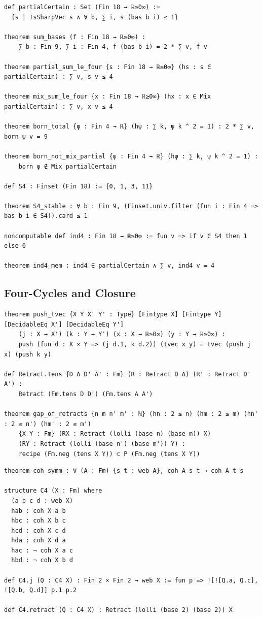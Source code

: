 \label{lean:quantum-partial}
\begin{lstlisting}
def partialCertain : Set (Fin 18 → ℝ≥0∞) :=
  {s | IsSharpVec s ∧ ∀ b, ∑ i, s (bas b i) ≤ 1}

theorem sum_bases (f : Fin 18 → ℝ≥0∞) :
    ∑ b : Fin 9, ∑ i : Fin 4, f (bas b i) = 2 * ∑ v, f v

theorem partial_sum_le_four {s : Fin 18 → ℝ≥0∞} (hs : s ∈ partialCertain) : ∑ v, s v ≤ 4

theorem mix_sum_le_four {x : Fin 18 → ℝ≥0∞} (hx : x ∈ Mix partialCertain) : ∑ v, x v ≤ 4

theorem born_total {ψ : Fin 4 → ℝ} (hψ : ∑ k, ψ k ^ 2 = 1) : 2 * ∑ v, born ψ v = 9

theorem born_not_mix_partial {ψ : Fin 4 → ℝ} (hψ : ∑ k, ψ k ^ 2 = 1) :
    born ψ ∉ Mix partialCertain

def S4 : Finset (Fin 18) := {0, 1, 3, 11}

theorem S4_stable : ∀ b : Fin 9, (Finset.univ.filter (fun i : Fin 4 => bas b i ∈ S4)).card ≤ 1

noncomputable def ind4 : Fin 18 → ℝ≥0∞ := fun v => if v ∈ S4 then 1 else 0

theorem ind4_mem : ind4 ∈ partialCertain ∧ ∑ v, ind4 v = 4
\end{lstlisting}

\subsection{Four-Cycles and Closure}

\label{lean:retract-tens}
\begin{lstlisting}
theorem push_tvec {X Y X' Y' : Type} [Fintype X] [Fintype Y] [DecidableEq X'] [DecidableEq Y']
    (j : X → X') (k : Y → Y') (x : X → ℝ≥0∞) (y : Y → ℝ≥0∞) :
    push (fun d : X × Y => (j d.1, k d.2)) (tvec x y) = tvec (push j x) (push k y)

def Retract.tens {D A D' A' : Fm} (R : Retract D A) (R' : Retract D' A') :
    Retract (Fm.tens D D') (Fm.tens A A')

theorem gap_of_retracts {n m n' m' : ℕ} (hn : 2 ≤ n) (hm : 2 ≤ m) (hn' : 2 ≤ n') (hm' : 2 ≤ m')
    {X Y : Fm} (RX : Retract (lolli (base n) (base m)) X)
    (RY : Retract (lolli (base n') (base m')) Y) :
    recipe (Fm.neg (tens X Y)) ⊂ P (Fm.neg (tens X Y))
\end{lstlisting}

\label{lean:c4-retract}
\begin{lstlisting}
theorem coh_symm : ∀ (A : Fm) {s t : web A}, coh A s t → coh A t s

structure C4 (X : Fm) where
  (a b c d : web X)
  hab : coh X a b
  hbc : coh X b c
  hcd : coh X c d
  hda : coh X d a
  hac : ¬ coh X a c
  hbd : ¬ coh X b d

def C4.j (Q : C4 X) : Fin 2 × Fin 2 → web X := fun p => ![![Q.a, Q.c], ![Q.b, Q.d]] p.1 p.2

def C4.retract (Q : C4 X) : Retract (lolli (base 2) (base 2)) X
\end{lstlisting}

